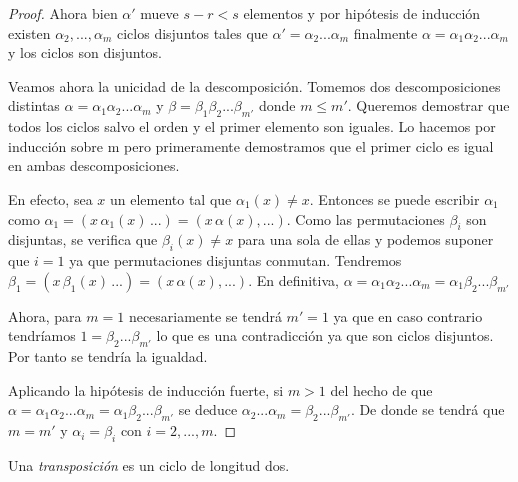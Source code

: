 \begin{proof}
Ahora bien $\alpha'$ mueve $s-r < s$ elementos y por hipótesis de inducción existen $\alpha_2,...,\alpha_m$ ciclos disjuntos tales que $\alpha' = \alpha_2...\alpha_m$ finalmente $\alpha = \alpha_1\alpha_2...\alpha_m$ y los ciclos son disjuntos.

Veamos ahora la unicidad de la descomposición. Tomemos dos descomposiciones distintas $\alpha = \alpha_1\alpha_2...\alpha_m$ y $\beta = \beta_1\beta_2...\beta_{m'}$ donde $m \le m'$. Queremos demostrar que todos los ciclos salvo el orden y el primer elemento son iguales. Lo hacemos por inducción sobre m pero primeramente demostramos que el primer ciclo es igual en ambas descomposiciones.

En efecto, sea $x$ un elemento tal que $\alpha_1(x) \neq x$. Entonces se puede escribir $\alpha_1$ como $\alpha_1 = (x \, \alpha_1(x) \, ...) = (x \, \alpha(x),...)$. Como las permutaciones $\beta_i$ son disjuntas, se verifica que $\beta_i(x) \neq x$ para una sola de ellas y podemos suponer que $i = 1$ ya que permutaciones disjuntas conmutan. Tendremos $\beta_1 = (x \, \beta_1(x) \, ...) = (x \, \alpha(x),...)$. En definitiva, $\alpha = \alpha_1\alpha_2...\alpha_m = \alpha_1\beta_2...\beta_{m'}$

Ahora, para $m = 1$ necesariamente se tendrá $m' = 1$ ya que en caso contrario tendríamos $1 = \beta_2...\beta_{m'}$ lo que es una contradicción ya que son ciclos disjuntos. Por tanto se tendría la igualdad. 

Aplicando la hipótesis de inducción fuerte, si $m > 1$ del hecho de que $\alpha = \alpha_1\alpha_2...\alpha_m = \alpha_1\beta_2...\beta_{m'}$ se deduce $\alpha_2...\alpha_m = \beta_2...\beta_{m'}$. De donde se tendrá que $m = m'$ y $\alpha_i = \beta_i$ con $i=2,...,m$.
\end{proof}

\begin{ndef}[Transposición]
Una \textit{transposición} es un ciclo de longitud dos.
\end{ndef}


